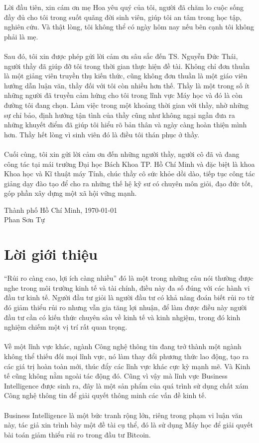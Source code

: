 Lời đầu tiên, xin cám ơn mẹ Hoa yêu quý của tôi, người đã chăm lo cuộc
sống đầy đủ cho tôi trong suốt quãng đời sinh viên, giúp tôi an tâm trong học
tập, nghiên cứu. Và thật lòng, tôi không thể có ngày hôm nay nếu bên 
cạnh tôi không phải là mẹ.\\\\
Sau đó, tôi xin được phép gửi lời cảm ơn sâu sắc đến TS. Nguyễn Đức Thái,
người thầy đã giúp đỡ tôi trong thời gian thực hiện đề tài.
Không chỉ đơn thuần là một giảng viên truyền thụ kiến thức, cũng không đơn thuần
là một giáo viên hướng dẫn luận văn, thầy đối với tôi còn nhiều hơn thế. Thầy là
một trong số ít những người đã truyền cảm hứng cho tôi trong lĩnh vực Máy học 
và đó là còn đường tôi đang chọn. Làm việc trong một khoảng thời gian với thầy, 
nhờ những sự chỉ bảo, định hướng tận tình của thầy cũng như không ngại ngần đưa 
ra những khuyết điểm đã giúp tôi hiểu rõ bản thân và ngày càng hoàn thiện mình 
hơn. Thầy hết lòng vì sinh viên đó là điều tôi thán phục ở thầy.\\\\
Cuối cùng, tôi xin gửi lời cảm ơn đến những người thầy, người cô đã và đang công 
tác tại mái trường Đại học Bách Khoa TP. Hồ Chí Minh và đặc biệt là khoa Khoa 
học và Kĩ thuật máy Tính, chúc thầy cô sức khỏe dồi dào, tiếp tục công tác giảng 
dạy đào tạo để cho ra những thế hệ kỹ sư có chuyên môn giỏi, đạo đức tốt, góp 
phần xây dựng một xã hội vững mạnh.
\vspace{2cm}
\begin{flushright}
Thành phố Hồ Chí Minh, \MakeLowercase{\today}\\ 
Phan Sơn Tự\\
\end{flushright}
\pagebreak

\section*{Lời giới thiệu}
\thispagestyle{plain} 
``Rủi ro càng cao, lợi ích càng nhiều'' đó là một trong những câu nói thường
được nghe trong môi trường kinh tế và tài chính, điều này đa số đúng với các hành vi đầu tư
kinh tế. Người đầu tư giỏi là người đầu tư có khả năng đoán biết rủi ro từ đó
giảm thiểu rủi ro nhưng vẫn gia tăng lợi nhuận, để làm được điều này người
đầu tư cần có kiến thức chuyên sâu về kinh tế và kinh nhgiệm, trong đó kinh 
nghiệm chiếm một vị trí rất quan trọng.\\\\
Về một lĩnh vực khác, ngành Công nghệ thông tin đang trở thành một ngành không 
thể thiếu đối mọi lĩnh vực, nó làm thay đổi phương thức lao động, tạo ra các 
giá trị hoàn toàn mới, thúc đẩy các lĩnh vực khác cực kỳ mạnh mẽ. Và Kinh tế 
cũng không nằm ngoài tác động đó. Cũng vì vậy mà lĩnh vực Business Intelligence
được sinh ra, đây là một sản phẩm của quá trình sử dụng chất xám Công nghệ 
thông tin để giải quyết thông minh các vấn đề kinh tế.\\\\
Business Intelligence là một bức tranh rộng lớn, riêng trong phạm vi luận văn 
này, tác giả xin trình bày một đề tài cụ thể, đó là sử dụng Máy học để 
giải quyết bài toán giảm thiểu rủi ro trong đầu tư Bitcoin.
\pagebreak